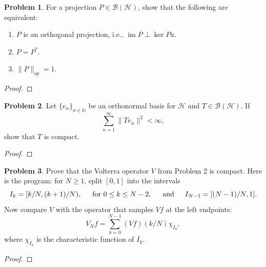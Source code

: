 \documentclass[12pt]{article}
\DeclareMathOperator{\im}{im}
\theoremstyle{definition}
\newtheorem{ex}{Problem}
\begin{document}
\begin{ex}
	For a projection $P \in \mathcal{B}(\mathscr{H})$, show that the following are equivalent:
	\begin{enumerate}[label=(\roman*)]
		\item $P$ is an orthogonal projection, i.e., $\im P \perp \ker P$x.
		\item $P = P^*$.
		\item $\|P\|_{op} = 1$.
	\end{enumerate}
\end{ex}
\begin{proof}

\end{proof}

\begin{ex}
	Let $\lbrace e_n \rbrace_{n \in \mathbb{N}}$ be an orthonormal basis for $\mathscr{H}$ and $T \in \mathcal{B}(\mathscr{H})$.
	If \begin{equation*}
		\sum_{n=1}^\infty \|Te_n\|^2 < \infty,
	\end{equation*}
	show that $T$ is compact.
\end{ex}
\begin{proof}

\end{proof}

\begin{ex}
	Prove that the Volterra operator $V$ from Problem 2 is compact.
	Here is the program: for $N \geq 1$, split $[0, 1]$ into the intervals \begin{equation*}
		I_k = [k/N, (k + 1)/N), \hspace{1.5em} \text{for } 0 \leq k \leq N - 2, \hspace{1.5em} \text{and} \hspace{1.5em} I_{N-1} = [(N - 1)/N, 1].
	\end{equation*}
	Now compare $V$ with the operator that samples $Vf$ at the left endpoints: \begin{equation*}
		V_Nf = \sum_{k=0}^{N-1} (Vf)(k/N) \chi_{I_k},
	\end{equation*}
	where $\chi_{I_k}$ is the characteristic function of $I_k$.
\end{ex}
\begin{proof}

\end{proof}
\end{document}
